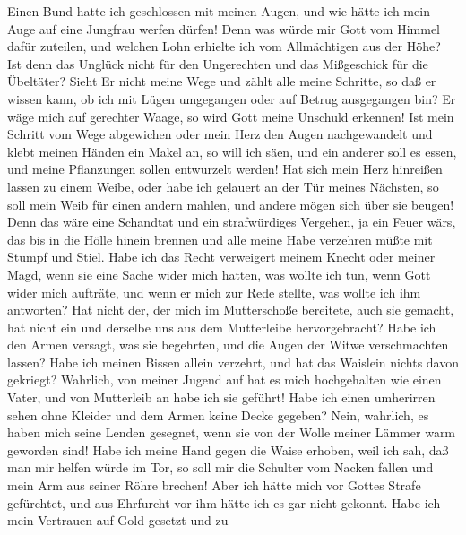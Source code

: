  Einen Bund hatte ich geschlossen mit meinen Augen, und
wie hätte ich mein Auge auf eine Jungfrau werfen dürfen! 
Denn was würde mir Gott vom Himmel dafür zuteilen, und welchen Lohn
erhielte ich vom Allmächtigen aus der Höhe?  Ist denn das
Unglück nicht für den Ungerechten und das Mißgeschick für die Übeltäter?
 Sieht Er nicht meine Wege und zählt alle meine Schritte,
 so daß er wissen kann, ob ich mit Lügen umgegangen oder
auf Betrug ausgegangen bin?  Er wäge mich auf gerechter
Waage, so wird Gott meine Unschuld erkennen!  Ist mein
Schritt vom Wege abgewichen oder mein Herz den Augen nachgewandelt und
klebt meinen Händen ein Makel an,  so will ich säen, und
ein anderer soll es essen, und meine Pflanzungen sollen entwurzelt
werden!  Hat sich mein Herz hinreißen lassen zu einem
Weibe, oder habe ich gelauert an der Tür meines Nächsten,
 so soll mein Weib für einen andern mahlen, und andere
mögen sich über sie beugen!  Denn das wäre eine Schandtat
und ein strafwürdiges Vergehen,  ja ein Feuer
wär\textquotesingle s, das bis in die Hölle hinein brennen und alle
meine Habe verzehren müßte mit Stumpf und Stiel.  Habe
ich das Recht verweigert meinem Knecht oder meiner Magd, wenn sie eine
Sache wider mich hatten,  was wollte ich tun, wenn Gott
wider mich aufträte, und wenn er mich zur Rede stellte, was wollte ich
ihm antworten?  Hat nicht der, der mich im Mutterschoße
bereitete, auch sie gemacht, hat nicht ein und derselbe uns aus dem
Mutterleibe hervorgebracht?  Habe ich den Armen versagt,
was sie begehrten, und die Augen der Witwe verschmachten lassen?
 Habe ich meinen Bissen allein verzehrt, und hat das
Waislein nichts davon gekriegt?  Wahrlich, von meiner
Jugend auf hat es mich hochgehalten wie einen Vater, und von Mutterleib
an habe ich sie geführt!  Habe ich einen umherirren sehen
ohne Kleider und dem Armen keine Decke gegeben?  Nein,
wahrlich, es haben mich seine Lenden gesegnet, wenn sie von der Wolle
meiner Lämmer warm geworden sind!  Habe ich meine Hand
gegen die Waise erhoben, weil ich sah, daß man mir helfen würde im Tor,
 so soll mir die Schulter vom Nacken fallen und mein Arm
aus seiner Röhre brechen!  Aber ich hätte mich vor Gottes
Strafe gefürchtet, und aus Ehrfurcht vor ihm hätte ich es gar nicht
gekonnt.  Habe ich mein Vertrauen auf Gold gesetzt und zu
